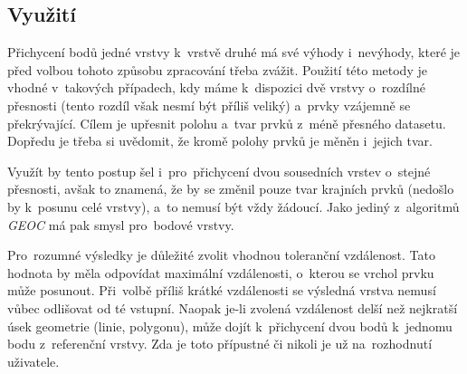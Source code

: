 \subsection{Využití}
\label{vs-vyuziti}

Přichycení bodů jedné vrstvy k~vrstvě druhé má své výhody i~nevýhody, které 
je před volbou tohoto způsobu zpracování třeba zvážit. Použití této metody 
je vhodné v~takových případech, kdy máme k~dispozici dvě vrstvy o~rozdílné 
přesnosti (tento rozdíl však nesmí být příliš veliký) a~prvky vzájemně se 
překrývající. Cílem je upřesnit polohu a~tvar prvků z~méně přesného datasetu. 
Dopředu je třeba si uvědomit, že kromě polohy prvků je měněn i~jejich tvar.

Využít by tento postup šel i~pro~přichycení dvou sousedních vrstev o~stejné 
přesnosti, avšak to znamená, že by se změnil pouze tvar krajních prvků 
(nedošlo by k~posunu celé vrstvy), a~to nemusí být vždy žádoucí. Jako jediný
z~algoritmů \textit{GEOC} má pak smysl pro~bodové vrstvy.

Pro~rozumné výsledky je důležité zvolit vhodnou toleranční vzdálenost. Tato 
hodnota by měla odpovídat maximální vzdálenosti, o~kterou se vrchol prvku 
může posunout. Při~volbě příliš krátké vzdálenosti se výsledná vrstva nemusí 
vůbec odlišovat od té vstupní. Naopak \mbox{je-li} zvolená vzdálenost delší 
než nejkratší úsek geometrie (linie, polygonu), může dojít k~přichycení dvou 
bodů k~jednomu bodu z~referenční vrstvy. Zda je toto přípustné či nikoli je 
už na~rozhodnutí uživatele.


% 



